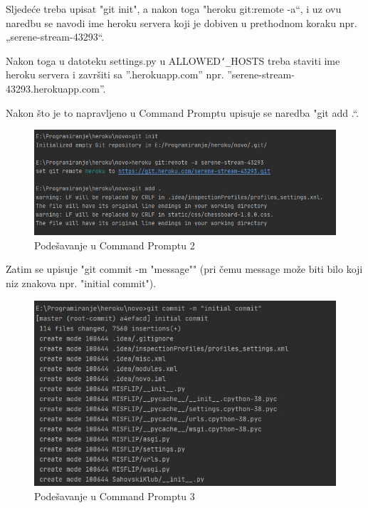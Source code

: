 			\noindent Sljedeće treba upisat "git init", a nakon toga "heroku git:remote -a“, i uz ovu naredbu se navodi ime heroku servera koji je dobiven u prethodnom koraku npr. „serene-stream-43293“.
			
			\noindent Nakon toga u datoteku settings.py u ALLOWED\texttt{\char`_}HOSTS treba staviti ime heroku servera i završiti sa ''.herokuapp.com'' npr. ''serene-stream-43293.herokuapp.com''. 
			
			\noindent Nakon što je to napravljeno u Command Promptu upisuje se naredba "git add .“.
			
			\begin{figure}[H]
				\centerfloat
				\includegraphics[scale=0.4]{slike/pustanjeupogon2.jpeg} %
				\caption{Podešavanje u Command Promptu 2}
				
			\end{figure}
			
			\eject
			
			\noindent Zatim se upisuje "git commit -m "message"" (pri čemu message može biti bilo koji niz znakova npr. "initial commit").
			
			\begin{figure}[H]
				\centerfloat
				\includegraphics[scale=0.4]{slike/pustanjeupogon3.jpeg} %
				\caption{Podešavanje u Command Promptu 3}
				
			\end{figure}
			

